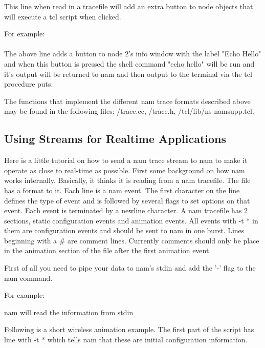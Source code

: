 This line when read in a tracefile will add an extra button to node objects that
will execute a tcl script when clicked.

For example:\\
\\

The above line adds a button to node 2's info window with the label 
"Echo Hello" and when this button is pressed the shell command 
"echo hello" will be run and it's output will be returned to nam and
then output to the terminal via the tcl procedure puts.


The functions that implement the different nam trace formats described
above may be found in the following files: \ns/trace.cc, 
\ns/trace.h, \ns/tcl/lib/ns-namsupp.tcl.


\subsection{Using Streams for Realtime Applications}

Here is a little tutorial on how to send a nam trace stream to nam to
make it operate as close to real-time as possible.  First some
background on how nam works internally.  Basically, it thinks it is
reading from a nam tracefile.  The file has a format to it.  Each line
is a nam event.  The first character on the line defines the type of
event and is followed by several flags to set options on that event.
Each event is terminated by a newline character.  A nam tracefile has 2
sections, static configuration events and animation events.  All events
with -t * in them are configuration events and should be sent to nam in
one burst.  Lines beginning with a \# are comment lines.  Currently
comments should only be place in the animation section of the file after
the first animation event.

First of all you need to pipe your data to nam's stdin and add the '-'
flag to the nam command.

For example:

\begin{program}
\end{program}

nam will read the information from stdin

Following is a short wireless animation example.  The first part of the
script has line with -t * which tells nam that these are initial
configuration information.

